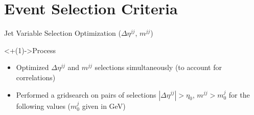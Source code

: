 \documentclass[handout]{beamer}
\begin{document}
%
%
\section{Event Selection Criteria}

\begin{frame}{Jet Variable Selection Optimization ($\Delta \eta^{jj}$, $m^{jj}$)}
    \begin{block}<+(1)->{Process}
        \begin{itemize}[<+(1)->]
            \item Optimized $\Delta \eta^{jj}$ and $m^{jj}$ selections simultaneously (to account for correlations)
            \item Performed a gridsearch on pairs of selections $|\Delta \eta^{jj}| > \eta_0$, $m^{jj} > m^j_0$ for the following values ($m^j_0$ given in GeV)
            
            \smallskip
            

\end{itemize}
\end{block}
\end{frame}
\end{document}
